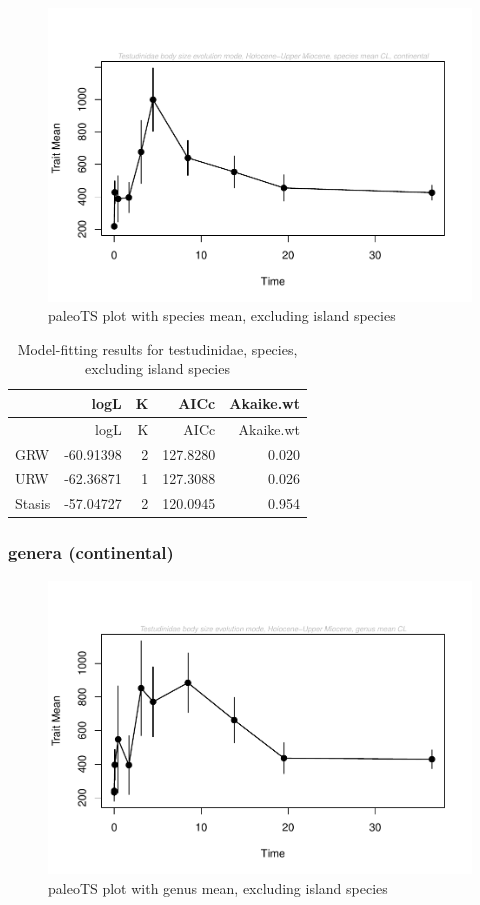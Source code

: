 \documentclass[]{article}
\begin{document}
\begin{figure}[htbp]
\centering
\includegraphics{MA_JJ_files/figure-latex/paleoTS plot with species mean, excluding island species-1.pdf}
\caption{paleoTS plot with species mean, excluding island species}
\end{figure}

\begin{longtable}[]{@{}lrrrr@{}}
\caption{Model-fitting results for testudinidae, species, excluding
island species}\tabularnewline
\toprule
& logL & K & AICc & Akaike.wt\tabularnewline
\midrule
\endfirsthead
\toprule
& logL & K & AICc & Akaike.wt\tabularnewline
\midrule
\endhead
GRW & -60.91398 & 2 & 127.8280 & 0.020\tabularnewline
URW & -62.36871 & 1 & 127.3088 & 0.026\tabularnewline
Stasis & -57.04727 & 2 & 120.0945 & 0.954\tabularnewline
\bottomrule
\end{longtable}

\newpage

\subsubsection{genera (continental)}\label{genera-continental}

\begin{figure}[htbp]
\centering
\includegraphics{MA_JJ_files/figure-latex/paleoTS plot with genus mean, excluding island species-1.pdf}
\caption{paleoTS plot with genus mean, excluding island species}
\end{figure}
\end{document}
